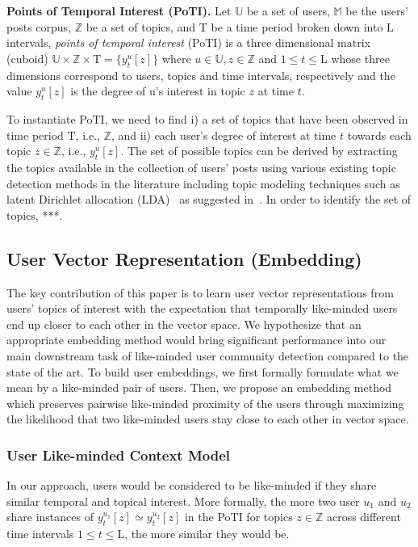 \documentclass[sigconf]{acmart}
\begin{document}
\begin{definition}
\textbf{Points of Temporal Interest (PoTI).} Let $\mathbb{U}$ be a set of users, $\mathbb{M}$ be the users' posts corpus, $\mathbb{Z}$ be a set of topics, and $\text{T}$ be a time period broken down into $\text{L}$ intervals, \textit{points of temporal interest} (PoTI) is a three dimensional matrix (cuboid) $\mathbb{U}\times\mathbb{Z}\times\text{T}= \{y^u_t[z]\}$ where $u\in\mathbb{U},z\in\mathbb{Z}$ and $1\leq{t}\leq\text{L}$ whose three dimensions correspond to users, topics and time intervals, respectively and the value $y^u_t[z]$ is the degree of u's interest in topic $z$ at time $t$.
\end{definition}

To instantiate PoTI, we need to find i) a set of topics that have been observed in time period $\text{T}$, i.e., $\mathbb{Z}$, and ii) each user's degree of interest at time $t$ towards each topic $z\in\mathbb{Z}$, i.e., $y^u_t[z]$. The set of possible topics can be derived by extracting the topics available in the collection of users' posts using various existing topic detection methods in the literature including topic modeling techniques such as latent Dirichlet allocation (LDA)~\cite{DBLP:journals/jmlr/BleiNJ03} as suggested in~\cite{}. In order to identify the set of topics, ***.

\subsection{User Vector Representation (Embedding)}
The key contribution of this paper is to learn user vector representations from users' topics of interest with the expectation that temporally like-minded users end up closer to each other in the vector space. We hypothesize that an appropriate embedding method would bring significant performance into our main downstream task of like-minded user community detection compared to the state of the art. To build user embeddings, we first formally formulate what we mean by a like-minded pair of users. Then, we propose an embedding method which preserves pairwise like-minded proximity of the users through maximizing the likelihood that two like-minded users stay close to each other in vector space.

\subsubsection{User Like-minded Context Model}
In our approach, users would be considered to be like-minded if they share similar temporal and topical interest. More formally, the more two user $u_1$ and $u_2$ share instances of $y^{u_1}_t[z]\simeq{y^{u_2}_t[z]}$ in the PoTI for topics $z\in\mathbb{Z}$ across different time intervals $1\leq{t}\leq\text{L}$, the more similar they would be.
\end{document}
